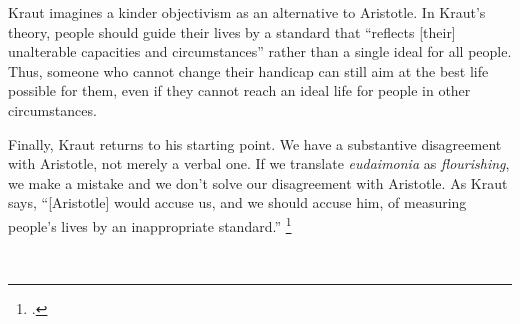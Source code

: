 \documentclass[12pt,letterpaper]{article}
\begin{document}
Kraut imagines a kinder objectivism as an alternative to Aristotle.
In Kraut's theory, people should guide their lives by a standard that ``reflects [their] unalterable capacities and circumstances'' rather than a single ideal for all people.
Thus, someone who cannot change their handicap can still aim at the best life possible for them, even if they cannot reach an ideal life for people in other circumstances.

Finally, Kraut returns to his starting point.
We have a substantive disagreement with Aristotle, not merely a verbal one.
If we translate \textit{eudaimonia} as \textit{flourishing}, we make a mistake and we don't solve our disagreement with Aristotle.
As Kraut says, ``[Aristotle] would accuse us, and we should accuse him, of measuring people's lives by an inappropriate standard.''%
\footcite[][197]{two-conceptions-of-happiness-kraut-1979}

\newpage\
\pagestyle{references}
\printbibliography[title={Bibliography}]
\end{document}
